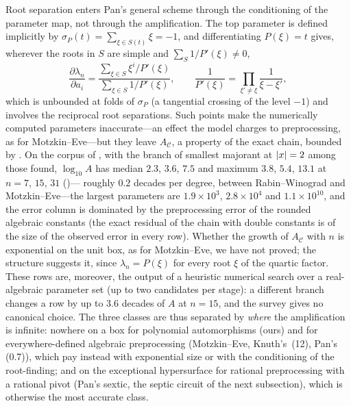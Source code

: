 \begin{remark}
\label{rem:pan07-roots}
Root separation enters Pan's general scheme through the conditioning of the
parameter map, not through the amplification.  The top parameter is defined
implicitly by $\sigma_P(t)=\sum_{\xi\in S(t)}\xi=-1$, and differentiating
$P(\xi)=t$ gives, wherever the roots in $S$ are simple and
$\sum_{S}1/P'(\xi)\ne0$,
\[
  \frac{\partial\lambda_n}{\partial a_i}
  =\frac{\sum_{\xi\in S}\xi^i/P'(\xi)}{\sum_{\xi\in S}1/P'(\xi)},\qquad
  \frac1{P'(\xi)}=\prod_{\xi'\ne\xi}\frac1{\xi-\xi'} ,
\]
which is unbounded at folds of $\sigma_P$ (a tangential crossing of the level
$-1$) and involves the reciprocal root separations.  Such points make the
numerically computed parameters inaccurate---an effect the model charges to
preprocessing, as for Motzkin--Eve---but they leave $A_{\mathcal C}$, a
property of the exact chain, bounded by .  On the
corpus of , with the branch of smallest majorant at
$\left\lvert x\right\rvert=2$ among those found, $\log_{10}A$ has median $2.3$, $3.6$, $7.5$ and
maximum $3.8$, $5.4$, $13.1$ at $n=7$, $15$, $31$ ()---
roughly $0.2$ decades per degree, between Rabin--Winograd and
Motzkin--Eve---the largest parameters are $1.9\times10^3$, $2.8\times10^4$
and $1.1\times10^{10}$, and the error column is dominated by the
preprocessing error of the rounded algebraic constants (the exact residual of
the chain with double constants is of the size of the observed error in every
row).  Whether the growth of $A_{\mathcal C}$ with $n$ is exponential on the
unit box, as for Motzkin--Eve, we have not proved; the structure suggests it,
since $\lambda_n=P(\xi)$ for every root $\xi$ of the quartic factor.  These
rows are, moreover, the output of a heuristic numerical search over a
real-algebraic parameter set (up to two candidates per stage): a different
branch changes a row by up to $3.6$ decades of $A$ at $n=15$, and the survey
gives no canonical choice.  The three classes are thus separated by
\emph{where} the amplification is infinite: nowhere on a box for polynomial
automorphisms (ours) and for everywhere-defined algebraic preprocessing
(Motzkin--Eve, Knuth's~(12), Pan's (0.7)), which pay instead with exponential
size or with the conditioning of the root-finding; and on the exceptional
hypersurface for rational preprocessing with a rational pivot (Pan's sextic,
the septic circuit of the next subsection), which is otherwise the most
accurate class.
\end{remark}

